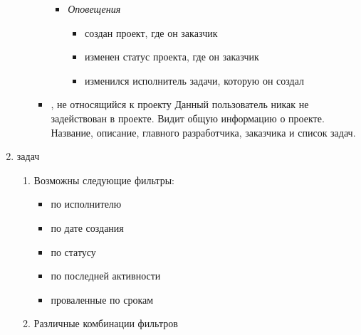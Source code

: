 \documentclass[14pt,a4paper]{extarticle}
\begin{document}
\begin{enumerate}
\begin{enumerate}
\begin{itemize}
\begin{itemize}
					\item {\it Оповещения}
					\begin{itemize}
						\item создан проект, где он заказчик
						\item изменен статус проекта, где он заказчик
						\item изменился исполнитель задачи, которую он создал
					\end{itemize}
					
				\end{itemize}
				
				\item {, не относящийся к проекту}
				Данный пользователь никак не задействован в проекте. Видит общую информацию о проекте. Название, описание, главного разработчика, заказчика и список задач.
			\end{itemize}
		\end{enumerate}
		
		
		\item { задач}
		\begin{enumerate}
			\item  Возможны следующие фильтры:
			\begin{itemize}
				\item по исполнителю
				\item по дате создания
				\item по статусу
				\item по последней активности
				\item проваленные по срокам
			\end{itemize}
			
			\item Различные комбинации фильтров
		\end{enumerate}
		
	\end{enumerate}
	
\end{document}
